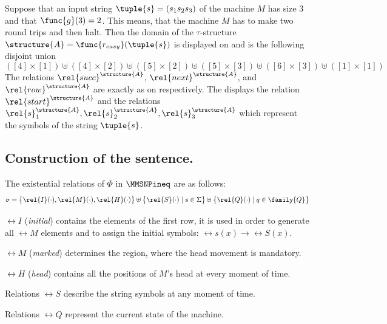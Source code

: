 \documentclass{lmcs}
\begin{document}
\begin{exa}\label{ex:construction}
Suppose that an input string $\tuple{s} = (s_1s_2s_3)$ of the machine $M$ has size $3$ and that $\func{g}(3)=2$.
This means, that the machine $M$ has to make two round trips and then halt.
Then the domain of the $\tau$-structure $\structure{A} = \func{r_{easy}}(\tuple{s})$ is displayed on  and is the following disjoint union
\begin{equation*}
([4]\times[1])\uplus([4]\times[2])\uplus([5]\times[2])\uplus([5]\times[3])\uplus([6]\times[3])\uplus([1]\times[1])
\end{equation*}
The relations $\rel{succ}^\structure{A}$, $\rel{next}^\structure{A}$, and $\rel{row}^\structure{A}$ are exactly as on  respectively.
The  displays the relation $\rel{start}^\structure{A}$ and the relations $\rel{s}_1^\structure{A},\rel{s}_2^\structure{A},\rel{s}_3^\structure{A}$ which represent the symbols of the string $\tuple{s}$.
\end{exa}

\subsection{Construction of the sentence.}\label{subsection:construction_of_phi}
The existential relations of $\Phi$ in $\MMSNPineq$ are as follows:
\begin{equation*}
\sigma = \bigl\{ \rel{I}(\cdot),\rel{M}(\cdot),\rel{H}(\cdot)\bigr\}\uplus \bigl\{\rel{S}(\cdot)\mid s\in\Sigma\bigr\}\uplus\bigl\{\rel{Q}(\cdot)\mid q\in\family{Q}\bigr\}
\end{equation*} 
\begin{compactitem}
\item $\rel{I}$ (\emph{initial}) contains the elements of the first row, it is used in order to generate all $\rel{M}$ elements and to assign the initial symbols: $\rel{s}(x)\to\rel{S}(x)$. %
\item $\rel{M}$ (\emph{marked}) determines the region, where the head movement is mandatory. %
\item $\rel{H}$ (\emph{head}) contains all the positions of $M$'s head at every moment of time. %
\item Relations $\rel{S}$ describe the string symbols at any moment of time.
\item Relations $\rel{Q}$ represent the current state of the machine.
\end{compactitem}
\end{document}
